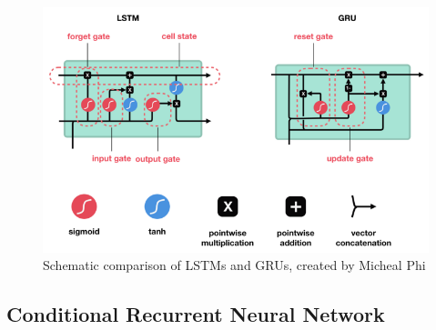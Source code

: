 \documentclass[
	ngerman,
	ruledheaders=section,%
	class=report,%
	thesis={type=bachelor},%
	accentcolor=9c,%
	custommargins=true,%
	marginpar=false,%
	parskip=half-,%
	fontsize=11pt,%
]{tudapub}
\begin{document}
\begin{figure}
    \includegraphics[width=\textwidth]{LSTMvGRU.png}
    \caption{Schematic comparison of LSTMs and GRUs, created by Micheal Phi \cite{phiIllustratedGuideLSTM2020}}
    \label{fig:LSTMvGRU}
\end{figure}




\subsection{Conditional Recurrent Neural Network}
\end{document}
